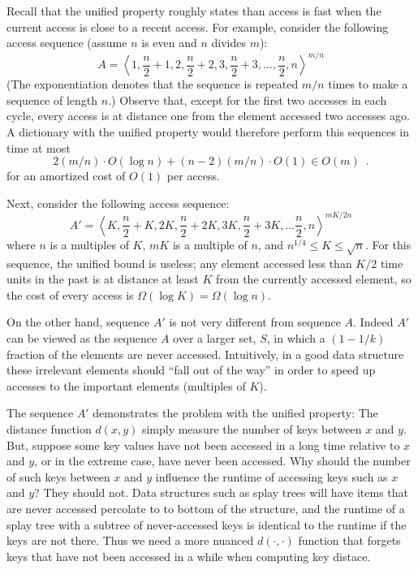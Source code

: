 \documentclass{llncs}
\begin{document}
Recall that the unified property roughly states than access is fast when the current access is close to a recent access. For example, consider the following access sequence (assume $n$ is even and $n$ divides $m$): %
\begin{equation}
	A = \left\langle 1, \frac{n}{2}+1, 2, \frac{n}{2}+2, 3, \frac{n}{2}+3, \ldots, \frac{n}{2}, n \right\rangle^{m/n} \label{eq:bear}
\end{equation}
(The exponentiation denotes that the sequence is repeated $m/n$ times
to make a sequence of length $n$.)
Observe that, except for the first two accesses in each cycle, every access is at distance one from the element accessed two accesses ago.  A dictionary with the unified
property would therefore perform this sequences in time at most
\[
   2(m/n)\cdot O(\log n) + (n-2)(m/n)\cdot O(1) \in O(m) \enspace .
\]
for an amortized cost of $O(1)$ per access.  

Next, consider the following access sequence:
\begin{equation}
	A' = \left\langle K, \frac{n}{2}+K, 2K, \frac{n}{2}+2K, 3K, \frac{n}{2}+3K, \ldots \frac{n}{2},n\right\rangle^{mK/2n}
\end{equation}
where $n$ is a multiples of $K$, $mK$ is a multiple of $n$, and $n^{1/4}\le K\le\sqrt{n}$. For this sequence, the unified bound is useless; any element accessed less than $K/2$ time units in the past is at distance at least $K$ from the currently accessed element, so the cost of every access is $\Omega(\log K) = \Omega(\log n)$.

On the other hand, sequence $A'$ is not very different from sequence $A$.  Indeed $A'$ can be viewed as the sequence $A$ over a larger set, $S$, in which a $(1-1/k)$ fraction of the elements are never accessed.  Intuitively, in a good data structure these irrelevant elements should ``fall out of the way'' in order to speed up accesses to the important elements (multiples of $K$).


The sequence $A'$ demonstrates the problem with the unified property: The distance function $d(x,y)$ simply measure the number of keys between $x$ and $y$. But, suppose some key values have not been accessed in a long time relative to $x$ and $y$, or in the extreme case, have never been accessed. Why should the number of such keys between $x$ and $y$ influence the runtime of accessing keys such as $x$ and $y$?
They should not. Data structures such as splay trees will have items that are never accessed percolate to to bottom of the structure, and the runtime of a splay tree with a subtree of never-accessed keys is identical to the runtime if the keys are not there. Thus we need a more nuanced $d(\cdot,\cdot)$ function that forgets keys that have not been accessed in a while when computing key distace.
\end{document}

